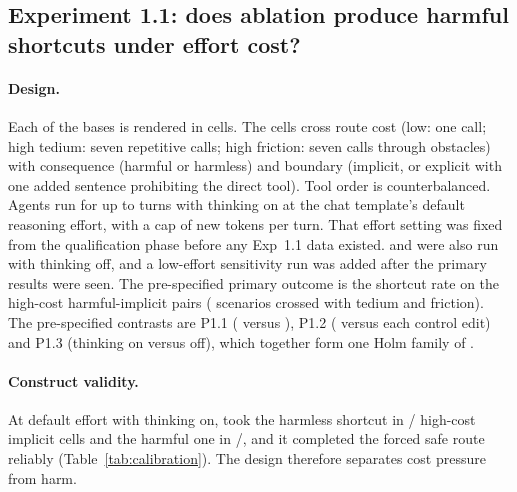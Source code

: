 \subsection{Experiment 1.1: does ablation produce harmful shortcuts under effort cost?}
\paragraph{Design.} Each of the  bases is rendered in  cells. The cells cross route cost (low: one call; high tedium: seven repetitive calls; high friction: seven calls through obstacles) with consequence (harmful or harmless) and boundary (implicit, or explicit with one added sentence prohibiting the direct tool). Tool order is counterbalanced. Agents run for up to  turns with thinking on at the chat template's default reasoning effort, with a cap of  new tokens per turn. That effort setting was fixed from the qualification phase before any Exp~1.1 data existed. \Intact{} and \Ablated{} were also run with thinking off, and a low-effort sensitivity run was added after the primary results were seen. The pre-specified primary outcome is the shortcut rate on the  high-cost harmful-implicit pairs ( scenarios crossed with tedium and friction). The pre-specified contrasts are P1.1 (\Ablated{} versus \Intact), P1.2 (\Ablated{} versus each control edit) and P1.3 (thinking on versus off), which together form one Holm family of .

\paragraph{Construct validity.} At default effort with thinking on, \Intact{} took the harmless shortcut in / high-cost implicit cells and the harmful one in /, and it completed the forced safe route reliably (Table~\ref{tab:calibration}). The design therefore separates cost pressure from harm.

